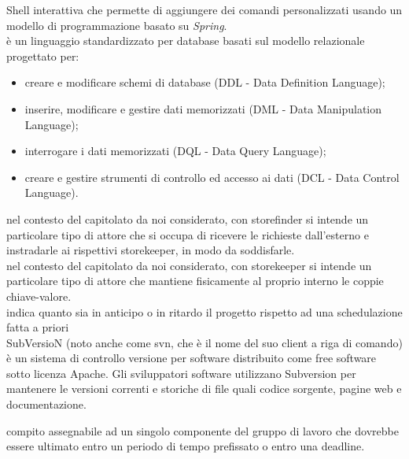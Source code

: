\documentclass{scalatekids-article}
\begin{document}
   Shell interattiva che permette di aggiungere dei comandi personalizzati usando un modello di programmazione basato su \textit{Spring}.
  \\

   è un linguaggio standardizzato per database basati sul modello relazionale progettato per:
  \begin{itemize}
  	\item creare e modificare schemi di database (DDL - Data Definition Language);
  	\item inserire, modificare e gestire dati memorizzati (DML - Data Manipulation Language);
  	\item interrogare i dati memorizzati (DQL - Data Query Language);
  	\item creare e gestire strumenti di controllo ed accesso ai dati (DCL - Data Control Language).
  \end{itemize}

 nel contesto del capitolato da noi considerato, con storefinder si intende un particolare tipo di attore che si occupa di ricevere le richieste dall’esterno e instradarle ai rispettivi storekeeper, in modo da soddisfarle.
\\

   nel contesto del capitolato da noi considerato, con storekeeper si intende un particolare tipo di attore che mantiene fisicamente al proprio interno le coppie chiave-valore.
  \\
  
   indica quanto sia in anticipo o in ritardo il progetto rispetto ad una schedulazione fatta a priori
  \\

   SubVersioN (noto anche come svn, che è il nome del suo client a riga di comando) è un sistema di controllo versione per software distribuito come free software sotto licenza Apache.
  Gli sviluppatori software utilizzano Subversion per mantenere le versioni correnti e storiche di file quali codice sorgente, pagine web e documentazione.
  \\


   compito assegnabile ad un singolo componente del gruppo di lavoro che dovrebbe essere ultimato entro un periodo di tempo prefissato o entro una deadline.
  \\
\end{document}
